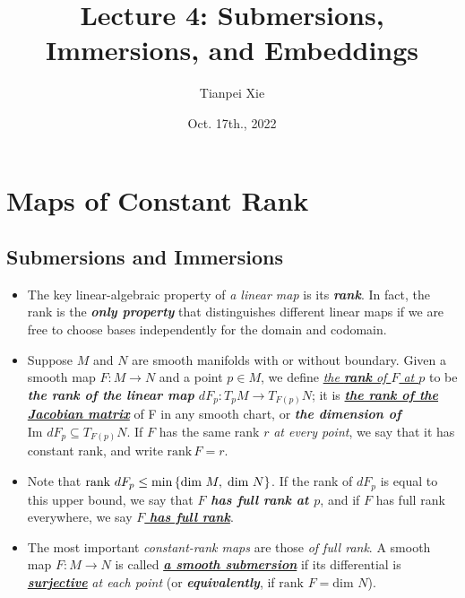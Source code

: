 \documentclass[11pt]{article}
\begin{document}
\title{Lecture 4: Submersions, Immersions, and Embeddings}
\author{ Tianpei Xie}
\date{Oct. 17th., 2022}
\maketitle
\tableofcontents
\newpage
\section{Maps of Constant Rank}
\subsection{Submersions and  Immersions}
\begin{itemize}
\item The key linear-algebraic property of \emph{a linear map} is its \emph{\textbf{rank}}. In fact,  the rank is the \emph{\textbf{only property}} that distinguishes different linear maps if we are free to choose bases independently for the domain and codomain.

\item \begin{definition}
Suppose $M$ and $N$ are smooth manifolds with or without boundary. Given a smooth map $F: M \rightarrow N$ and a point $p \in M$, we define \underline{\emph{the \textbf{rank} of $F$ at $p$}} to be \emph{\textbf{the rank of the linear map} $dF_p: T_{p}M \rightarrow T_{F(p)}N$}; it is \underline{\emph{\textbf{the rank of the Jacobian matrix}}} of F in any smooth chart, or \emph{\textbf{the dimension of}} $\text{Im }dF_p \subseteq T_{F(p)}N$. If $F$ has the same rank $r$ \emph{at every point}, we say that it has constant rank, and write \underline{$\text{rank}\,F = r$}.
\end{definition}

\item \begin{definition}
Note that $\text{rank }dF_{p} \le \min\left\{\text{dim }M, \; \text{dim }N\right\}$. If the rank of $dF_p$ is equal to this upper bound, we say that \emph{\textbf{$F$ has full rank at $p$}}, and if $F$ has full rank everywhere, we say \underline{\emph{\textbf{$F$ has full rank}}}.
\end{definition}

\item \begin{definition}
The most important \emph{constant-rank maps} are those \emph{of full rank}. A smooth map $F: M \rightarrow N$ is called \underline{\emph{\textbf{a smooth submersion}}} if its differential is \underline{\emph{\textbf{surjective}}} \emph{at each point} (or \emph{\textbf{equivalently}}, if \underline{$\text{rank }F = \text{dim }N$}). 


\end{definition}
\end{itemize}
\end{document}
